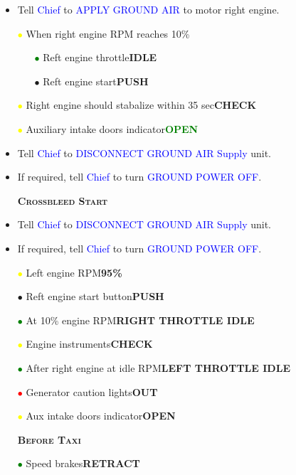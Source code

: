 \documentclass[a4paper,12pt,dvipsnames]{letter}
\newcommand{\radio}[1]{\textcolor{blue}{#1}}
\newcommand{\button}[1]{\textbf{#1}}
\newcommand{\ok}[1]{\textcolor{Green}{\textbf{#1}}}
\newcommand{\myHead}[1]{{\LARGE\textsc{\textbf{#1}}}}
\newcommand{\bi}{\textcolor{ProcessBlue}{$\bullet$\;}}
\newcommand{\ri}{\textcolor{Red}{$\bullet$\;}}
\newcommand{\gi}{\textcolor{Green}{$\bullet$\;}}
\newcommand{\yi}{\textcolor{Yellow}{$\bullet$\;}}
\begin{document}
{\begin{itemize}
\begin{itemize}
  \item[\yi]Auxiliary intake doors indicator\dotfill\ok{BARBER POLE}
 \end{itemize}
 \item Tell \radio{Chief} to \radio{APPLY GROUND AIR} to motor right engine.
 \item[\yi] When right engine RPM reaches 10\;\%
 \begin{itemize}
  \item[\gi] Reft engine throttle\dotfill\button{IDLE}
  \item[\bi] Reft engine start\dotfill\button{PUSH}
 \end{itemize}
 \item[\yi] Right engine should stabalize within 35 sec\dotfill\button{CHECK}
 \item[\yi] Auxiliary intake doors indicator\dotfill\ok{OPEN}
 \item Tell \radio{Chief} to \radio{DISCONNECT GROUND AIR Supply} unit.
 \item If required, tell \radio{Chief} to turn \radio{GROUND POWER OFF}.
\end{itemize}
\newpage
\begin{itemize}
 \item[] \myHead{Crossbleed Start}
 \item Tell \radio{Chief} to \radio{DISCONNECT GROUND AIR Supply} unit.
 \item If required, tell \radio{Chief} to turn \radio{GROUND POWER OFF}.
 \item[\yi] Left engine RPM\dotfill\button{95\;\%}
 \item[\bi] Reft engine start button\dotfill\button{PUSH}
 \item[\gi] At 10\;\% engine RPM\dotfill\button{RIGHT THROTTLE IDLE}
 \item[\yi] Engine instruments\dotfill\button{CHECK}
 \item[\gi] After right engine at idle RPM\dotfill\button{LEFT THROTTLE IDLE}
 \item[\ri] Generator caution lights\dotfill\button{OUT}
 \item[\yi] Aux intake doors indicator\dotfill\button{OPEN}
\end{itemize}
\newpage
\begin{itemize}
 \item[] \myHead{Before Taxi}
 \item[\gi] Speed brakes\dotfill\button{RETRACT}

\end{itemize}}
\end{document}
